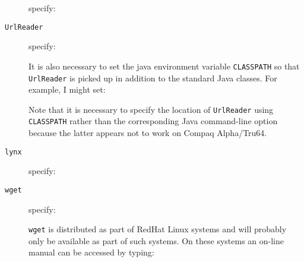 \documentclass[twoside,11pt]{starlink}
\providecommand{\geturl}{\htmlref{\texttt{geturl}}{GETURL}}
\begin{document}
\begin{description}

  \item[\geturl] specify:

  \begin{terminalv}
  \end{terminalv}

  \item[\texttt{UrlReader}] specify:

  \begin{terminalv}
  \end{terminalv}

   It is also necessary to set the java environment variable \texttt{CLASSPATH}
   so that \texttt{UrlReader} is picked up in addition to the standard Java
   classes.  For example, I might set:

  \begin{terminalv}
  \end{terminalv}

   Note that it is necessary to specify the location of \texttt{UrlReader}
   using \texttt{CLASSPATH} rather than the corresponding Java command-line
   option    because the latter appears not to work on Compaq Alpha/Tru64.

  \item[\texttt{lynx}] specify:

  \begin{terminalv}
  \end{terminalv}

  \item[\texttt{wget}] specify:

  \begin{terminalv}
  \end{terminalv}

   \texttt{wget} is distributed as part of RedHat Linux systems and will
   probably only be available as part of such systems.  On these systems
   an on-line manual can be accessed by typing:

  \begin{terminalv}
  \end{terminalv}

\end{description}
\end{document}
